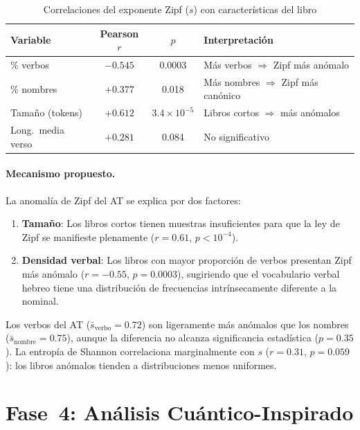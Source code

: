 \documentclass[12pt,a4paper]{article}
\newcommand{\val}[1]{\textcolor{hlcolor}{\textbf{#1}}}
\begin{document}
\begin{table}[H]
\centering
\caption{Correlaciones del exponente Zipf ($s$) con caracter\'isticas del libro}
\label{tab:zipfcorr}
\begin{tabular}{lccl}
\toprule
\textbf{Variable} & \textbf{Pearson $r$} & \textbf{$p$} & \textbf{Interpretaci\'on} \\
\midrule
\% verbos            & \val{$-0.545$} & 0.0003 & M\'as verbos $\Rightarrow$ Zipf m\'as an\'omalo \\
\% nombres           & $+0.377$ & 0.018 & M\'as nombres $\Rightarrow$ Zipf m\'as can\'onico \\
Tama\~no (tokens)    & \val{$+0.612$} & $3.4 \times 10^{-5}$ & Libros cortos $\Rightarrow$ m\'as an\'omalos \\
Long.\ media verso   & $+0.281$ & 0.084 & No significativo \\
\bottomrule
\end{tabular}
\end{table}

\paragraph{Mecanismo propuesto.}
La anomal\'ia de Zipf del AT se explica por dos factores:
\begin{enumerate}[leftmargin=2em]
\item \textbf{Tama\~no}: Los libros cortos tienen muestras insuficientes para que la ley de Zipf
      se manifieste plenamente ($r = 0.61$, $p < 10^{-4}$).
\item \textbf{Densidad verbal}: Los libros con mayor proporci\'on de verbos presentan Zipf
      m\'as an\'omalo ($r = -0.55$, $p = 0.0003$), sugiriendo que el vocabulario verbal hebreo
      tiene una distribuci\'on de frecuencias intr\'insecamente diferente a la nominal.
\end{enumerate}

Los verbos del AT ($\bar{s}_{\text{verbo}} = 0.72$) son ligeramente m\'as an\'omalos que
los nombres ($\bar{s}_{\text{nombre}} = 0.75$), aunque la diferencia no alcanza significancia
estad\'istica ($p = 0.35$). La entrop\'ia de Shannon correlaciona marginalmente con $s$
($r = 0.31$, $p = 0.059$): los libros an\'omalos tienden a distribuciones menos uniformes.


\section{Fase~4: An\'alisis Cu\'antico-Inspirado}
\end{document}
